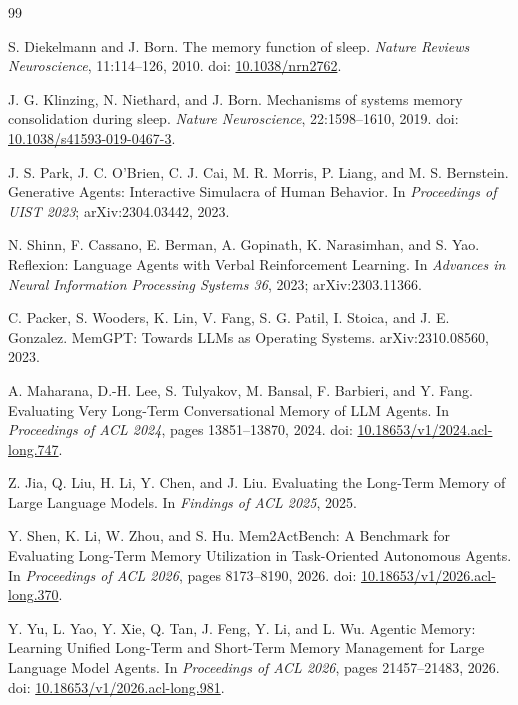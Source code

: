 \documentclass[11pt,a4paper]{article}
\begin{document}
\clearpage
\begin{thebibliography}{99}

S. Diekelmann and J. Born.
\newblock The memory function of sleep.
\newblock \emph{Nature Reviews Neuroscience}, 11:114--126, 2010.
\newblock doi: \href{https://doi.org/10.1038/nrn2762}{10.1038/nrn2762}.

J. G. Klinzing, N. Niethard, and J. Born.
\newblock Mechanisms of systems memory consolidation during sleep.
\newblock \emph{Nature Neuroscience}, 22:1598--1610, 2019.
\newblock doi: \href{https://doi.org/10.1038/s41593-019-0467-3}{10.1038/s41593-019-0467-3}.

J. S. Park, J. C. O'Brien, C. J. Cai, M. R. Morris, P. Liang, and M. S. Bernstein.
\newblock Generative Agents: Interactive Simulacra of Human Behavior.
\newblock In \emph{Proceedings of UIST 2023}; arXiv:2304.03442, 2023.

N. Shinn, F. Cassano, E. Berman, A. Gopinath, K. Narasimhan, and S. Yao.
\newblock Reflexion: Language Agents with Verbal Reinforcement Learning.
\newblock In \emph{Advances in Neural Information Processing Systems 36}, 2023; arXiv:2303.11366.

C. Packer, S. Wooders, K. Lin, V. Fang, S. G. Patil, I. Stoica, and J. E. Gonzalez.
\newblock MemGPT: Towards LLMs as Operating Systems.
\newblock arXiv:2310.08560, 2023.

A. Maharana, D.-H. Lee, S. Tulyakov, M. Bansal, F. Barbieri, and Y. Fang.
\newblock Evaluating Very Long-Term Conversational Memory of LLM Agents.
\newblock In \emph{Proceedings of ACL 2024}, pages 13851--13870, 2024.
\newblock doi: \href{https://doi.org/10.18653/v1/2024.acl-long.747}{10.18653/v1/2024.acl-long.747}.

Z. Jia, Q. Liu, H. Li, Y. Chen, and J. Liu.
\newblock Evaluating the Long-Term Memory of Large Language Models.
\newblock In \emph{Findings of ACL 2025}, 2025.

Y. Shen, K. Li, W. Zhou, and S. Hu.
\newblock Mem2ActBench: A Benchmark for Evaluating Long-Term Memory Utilization in Task-Oriented Autonomous Agents.
\newblock In \emph{Proceedings of ACL 2026}, pages 8173--8190, 2026.
\newblock doi: \href{https://doi.org/10.18653/v1/2026.acl-long.370}{10.18653/v1/2026.acl-long.370}.

Y. Yu, L. Yao, Y. Xie, Q. Tan, J. Feng, Y. Li, and L. Wu.
\newblock Agentic Memory: Learning Unified Long-Term and Short-Term Memory Management for Large Language Model Agents.
\newblock In \emph{Proceedings of ACL 2026}, pages 21457--21483, 2026.
\newblock doi: \href{https://doi.org/10.18653/v1/2026.acl-long.981}{10.18653/v1/2026.acl-long.981}.


\end{thebibliography}
\end{document}
